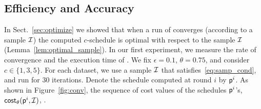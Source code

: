 


\subsection{Efficiency and Accuracy}
In Sect.~\ref{sec:optimize} we showed that when a run of \algonameapx converges
(according to a sample $\mathcal{I}$) the computed $c$-schedule is optimal with
respect to the sample $\mathcal{I}$ (Lemma~\ref{lem:optimal_sample}). In our first
experiment, we measure the rate of convergence and the execution time of
\algonameapx. We fix $\epsilon=0.1$, $\theta=0.75$, and consider
$c\in\{1,3,5\}$. For each dataset, we use a sample $\mathcal{I}$ that satisfies~\eqref{eq:samp_cond}, and run \algonameapx
for 30 iterations. Denote the schedule computed at round $i$ by $\mathsf{p}^i$.
As shown in Figure~\ref{fig:conv}, the sequence of cost values of the schedules
$\mathsf{p}^i$'s, $\mathsf{cost}_\theta(\mathsf{p}^i,\mathcal{I})$, .


